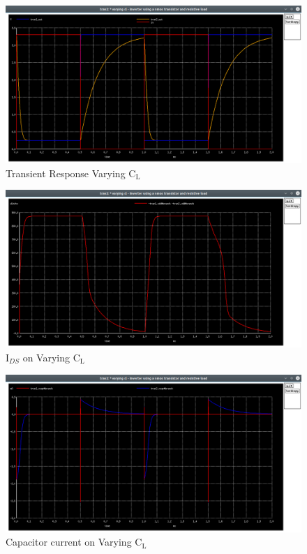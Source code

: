 \documentclass[12pt, a4paper]{article}
\begin{document}
	\begin{figure}[H]
		\begin{center}
			\includegraphics[scale=0.25]{images/inverter_cl_tran.png}
			\caption{Transient Response Varying $\text{C}_\text{L}$}
			\label{fig::varying_cl_tran}
		\end{center}
	\end{figure}
	
	\begin{figure}[H]
		\begin{center}
			\includegraphics[scale=0.25]{images/inverter_cl_vdd.png}
			\caption{$\text{I}_{DS}$ on Varying $\text{C}_\text{L}$}
			\label{fig::varying_cl_vdd}
		\end{center}
	\end{figure}
	\begin{figure}[H]
		\begin{center}
			\includegraphics[scale=0.25]{images/inverter_cl_vcap.png}
			\caption{Capacitor current on Varying $\text{C}_\text{L}$}
			\label{fig::varying_cl_vcap}
		\end{center}
	\end{figure}
	
\end{document}
